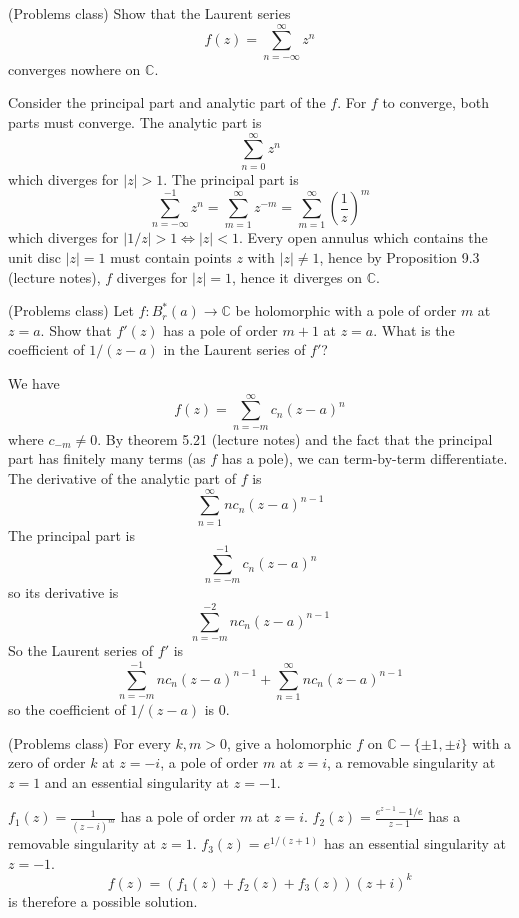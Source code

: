 \begin{example}
	(Problems class) Show that the Laurent series
	\[
		f(z) = \sum_{n = -\infty}^{\infty} z^n
	\]
	converges nowhere on $\mathbb{C}$.

	Consider the principal part and analytic part of the $f$. For $f$ to converge, both parts must converge. The analytic part is
	\[
		\sum_{n = 0}^{\infty} z^n
	\]
	which diverges for $|z| > 1$. The principal part is
	\[
		\sum_{n = -\infty}^{-1} z^n = \sum_{m = 1}^{\infty} z^{-m} = \sum_{m = 1}^{\infty} {(\frac{1}{z})}^m
	\]
	which diverges for $|1 / z| > 1 \Longleftrightarrow |z| < 1$. Every open annulus which contains the unit disc $|z| = 1$ must contain points $z$ with $|z| \ne 1$, hence by Proposition 9.3 (lecture notes), $f$ diverges for $|z| = 1$, hence it diverges on $\mathbb{C}$.
\end{example}

\begin{example}
	(Problems class) Let $f: B_r^*(a) \to \mathbb{C}$ be holomorphic with a pole of order $m$ at $z = a$. Show that $f'(z)$ has a pole of order $m + 1$ at $z = a$. What is the coefficient of $1 / (z - a)$ in the Laurent series of $f'$?

	We have
	\[
		f(z) = \sum_{n = -m}^{\infty} c_n {(z - a)}^n
	\]
	where $c_{-m} \ne 0$. By theorem 5.21 (lecture notes) and the fact that the principal part has finitely many terms (as $f$ has a pole), we can term-by-term differentiate. The derivative of the analytic part of $f$ is
	\[
		\sum_{n = 1}^{\infty} n c_n {(z - a)}^{n - 1}
	\]
	The principal part is
	\[
		\sum_{n = -m}^{-1} c_n {(z - a)}^n
	\]
	so its derivative is
	\[
		\sum_{n = -m}^{-2} n c_n {(z - a)}^{n - 1}
	\]
	So the Laurent series of $f'$ is
	\[
		\sum_{n = -m}^{-1} n c_n {(z - a)}^{n - 1} + \sum_{n = 1}^{\infty} n c_n {(z - a)}^{n - 1}
	\]
	so the coefficient of $1 / (z - a)$ is $0$.
\end{example}

\begin{example}
	(Problems class) For every $k, m > 0$, give a holomorphic $f$ on $\mathbb{C} - \{ \pm 1, \pm i \}$ with a zero of order $k$ at $z = -i$, a pole of order $m$ at $z = i$, a removable singularity at $z = 1$ and an essential singularity at $z = -1$.

	$f_1(z) = \frac{1}{{(z - i)}^m}$ has a pole of order $m$ at $z = i$. $f_2(z) = \frac{e^{z - 1} - 1/e}{z - 1}$ has a removable singularity at $z = 1$. $f_3(z) = e^{1/(z + 1)}$ has an essential singularity at $z = -1$.
	\[
		f(z) = (f_1(z) + f_2(z) + f_3(z)) {(z + i)}^k
	\]
	is therefore a possible solution.
\end{example}

